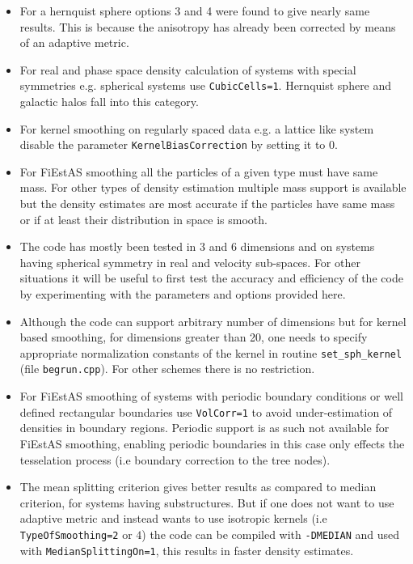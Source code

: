 \documentclass{article}
\begin{document}
\begin{itemize}
\item For a hernquist sphere options 3 and 4 
were found to give nearly same results.
This is because the anisotropy has already been corrected by means
of an adaptive metric. 
\item For real and phase space density calculation of 
systems with special symmetries e.g. spherical
systems use \verb$CubicCells=1$. Hernquist sphere and galactic halos
fall into this category.
\item For kernel smoothing on regularly spaced
data e.g. a lattice like system disable the parameter
\verb$KernelBiasCorrection$ by setting it to $0$.
\item
For FiEstAS smoothing all the particles of a given type must have same mass.
For other types of density estimation multiple mass support is available 
but the density estimates are most accurate if the particles have same mass 
or if at least  their distribution in space is smooth. 
\item The code has mostly been tested in 3 and 6 dimensions 
and on systems having spherical symmetry in real and velocity sub-spaces. 
For other situations it will be useful to first test the accuracy and
efficiency of the code by experimenting with the   
parameters and options provided here.
\item Although the code can support arbitrary number of dimensions
but for kernel based smoothing, for dimensions greater than 20, 
one needs to specify appropriate normalization constants of the kernel
in routine \newline\verb$set_sph_kernel$ (file \verb$begrun.cpp$).
For other schemes there is no restriction.
\item  For FiEstAS smoothing of systems with periodic boundary conditions or well defined
rectangular boundaries use \verb$VolCorr=1$ to avoid under-estimation of densities 
in boundary regions. Periodic support is as such not available
 for FiEstAS smoothing, enabling periodic boundaries in this case 
only effects  the tesselation process (i.e boundary correction to the tree nodes).
\item 
The mean splitting criterion gives better results as compared to median criterion, 
for systems having substructures.  But if  one does not want to use adaptive metric  
and instead wants to use isotropic kernels  (i.e \verb$TypeOfSmoothing=2$ or $4$)  
the code can be compiled with \verb$-DMEDIAN$  
and used with \verb$MedianSplittingOn=1$, this results in faster density estimates.
\end{itemize}
\end{document}
